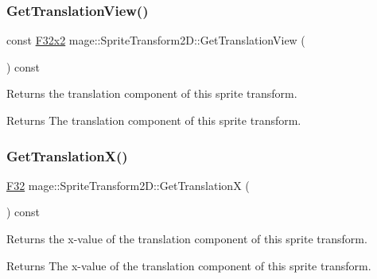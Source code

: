 \subsubsection{\texorpdfstring{Get\+Translation\+View()}{GetTranslationView()}}
{\footnotesize\ttfamily const \mbox{\hyperlink{namespacemage_aee4759dedc8def6c6dec26b5c7eddf29}{F32x2}} mage\+::\+Sprite\+Transform2\+D\+::\+Get\+Translation\+View (\begin{DoxyParamCaption}{ }\end{DoxyParamCaption}) const\hspace{0.3cm}{\ttfamily [noexcept]}}

Returns the translation component of this sprite transform.

\begin{DoxyReturn}{Returns}
The translation component of this sprite transform. 
\end{DoxyReturn}
\mbox{\label{classmage_1_1_sprite_transform2_d_a9ecfb651c93a75eba822c0d9779bfb1a}} 
\subsubsection{\texorpdfstring{Get\+Translation\+X()}{GetTranslationX()}}
{\footnotesize\ttfamily \mbox{\hyperlink{namespacemage_aa97e833b45f06d60a0a9c4fc22ae02c0}{F32}} mage\+::\+Sprite\+Transform2\+D\+::\+Get\+TranslationX (\begin{DoxyParamCaption}{ }\end{DoxyParamCaption}) const\hspace{0.3cm}{\ttfamily [noexcept]}}

Returns the x-\/value of the translation component of this sprite transform.

\begin{DoxyReturn}{Returns}
The x-\/value of the translation component of this sprite transform. 
\end{DoxyReturn}
\mbox{\label{classmage_1_1_sprite_transform2_d_a4c7ca12c213a432f52146bbc58d7e66a}} 
